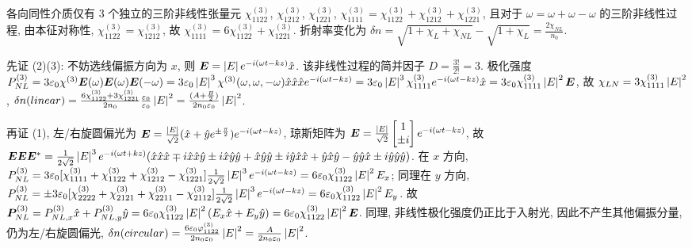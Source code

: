 \documentclass{assignment}
\begin{document}
\begin{pf}
    各向同性介质仅有 3 个独立的三阶非线性张量元 $\chi_{1122}^{(3)}$, $\chi_{1212}^{(3)}$, $\chi_{1221}^{(3)}$, $\chi_{1111}^{(3)}=\chi_{1122}^{(3)}+\chi_{1212}^{(3)}+\chi_{1221}^{(3)}$, 且对于 $\omega=\omega+\omega-\omega$ 的三阶非线性过程, 由本征对称性, $\chi_{1122}^{(3)}=\chi_{1212}^{(3)}$, 故 $\chi_{1111}^{(3)}=6\chi_{1122}^{(3)}+\chi_{1221}^{(3)}$.
    折射率变化为 $\delta n=\sqrt{1+\chi_L+\chi_{NL}}-\sqrt{1+\chi_L}=\frac{2\chi_{NL}}{n_0}$.

    先证 (2)(3): 不妨选线偏振方向为 $x$, 则 $\bm{E}=\left\lvert E\right\rvert e^{-i(\omega t-kz)}\hat{x}$.
    该非线性过程的简并因子 $D=\frac{3!}{2!}=3$.
    极化强度 $P_{NL}^{(3)}=3\varepsilon_0\chi^{(3)}\bm{E}(\omega)\bm{E}(\omega)\bm{E}(-\omega)=3\varepsilon_0\left\lvert E\right\rvert^3\chi^{(3)}(\omega,\omega,-\omega)\hat{x}\hat{x}\hat{x}e^{-i(\omega t-kz)}=3\varepsilon_0\left\lvert E\right\rvert^3\chi_{1111}^{(3)}e^{-i(\omega t-kz)}\hat{x}=3\varepsilon_0\chi_{1111}^{(3)}\left\lvert E\right\rvert^2\bm{E}$, 故 $\chi_{LN}=3\chi_{1111}^{(3)}\left\lvert E\right\rvert^2$, $\delta n(linear)=\frac{6\chi_{1122}^{(3)}+3\chi_{1221}^{(3)}}{2n_0}\frac{\varepsilon_0}{\varepsilon_0}\left\lvert E\right\rvert^2=\frac{(A+\frac{B}{2})}{2n_0\varepsilon_0}\left\lvert E\right\rvert^2$.

    再证 (1), 左/右旋圆偏光为 $\bm{E}=\frac{\left\lvert E\right\rvert}{\sqrt{2}}(\hat{x}+\hat{y}e^{\pm\frac{\pi}{2}})e^{-i(\omega t-kz)}$, 琼斯矩阵为 $\bm{E}=\frac{\left\lvert E\right\rvert}{\sqrt{2}}\begin{bmatrix}
        1\\
        \pm i
    \end{bmatrix}e^{-i(\omega t-kz)}$, 故 $\bm{E}\bm{E}\bm{E}^*=\frac{1}{2\sqrt{2}}\left\lvert E\right\rvert^3e^{-i(\omega t+kz)}(\hat{x}\hat{x}\hat{x}\mp i\hat{x}\hat{x}\hat{y}\pm i\hat{x}\hat{y}\hat{y}+\hat{x}\hat{y}\hat{y}\pm i\hat{y}\hat{x}\hat{x}+\hat{y}\hat{x}\hat{y}-\hat{y}\hat{y}\hat{x}\pm i\hat{y}\hat{y}\hat{y})$.
    在 $x$ 方向, $P_{NL}^{(3)}=3\varepsilon_0[\chi_{1111}^{(3)}+\chi_{1122}^{(3)}+\chi_{1212}^{(3)}-\chi_{1221}^{(3)}]\frac{1}{2\sqrt{2}}\left\lvert E\right\rvert^3e^{-i(\omega t-kz)}=6\varepsilon_0\chi_{1122}^{(3)}\left\lvert E\right\rvert^2E_x$;
    同理在 $y$ 方向, $P_{NL}^{(3)}=\pm 3\varepsilon_0[\chi_{2222}^{(3)}+\chi_{2121}^{(3)}+\chi_{2211}^{(3)}-\chi_{2112}^{(3)}]\frac{1}{2\sqrt{2}}\left\lvert E\right\rvert^3e^{-i(\omega t-kz)}=6\varepsilon_0\chi_{1122}^{(3)}\left\lvert E\right\rvert^2E_y$.
    故 $\bm{P}_{NL}^{(3)}=P_{NL,x}^{(3)}\hat{x}+P_{NL,y}^{(3)}\hat{y}=6\varepsilon_0\chi_{1122}^{(3)}\left\lvert E\right\rvert^2(E_x\hat{x}+E_y\hat{y})=6\varepsilon_0\chi_{1122}^{(3)}\left\lvert E\right\rvert^2\bm{E}$.
    同理, 非线性极化强度仍正比于入射光, 因此不产生其他偏振分量, 仍为左/右旋圆偏光, $\delta n(circular)=\frac{6\varepsilon_0\varphi_{1122}^{(3)}}{2n_0\varepsilon_0}\left\lvert E\right\rvert^2=\frac{A}{2n_0\varepsilon_0}\left\lvert E\right\rvert^2$.
\end{pf}
\end{document}
